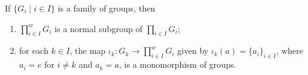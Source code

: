 \begin{theorem}
If $\{G_i \mid i \in I\}$ is a family of groups, then
\begin{enumerate}
    \item[(i)] $\prod_{i \in I}^w G_i$ is a normal subgroup of $\prod_{i \in I} G_i$;
    \item[(ii)] for each $k \in I$, the map $\iota_k : G_k \rightarrow \prod_{i \in I}^w G_i$ given by $\iota_k(a) = \{a_i\}_{i \in I}$, where $a_i = e$ for $i \neq k$ and $a_k = a$, is a monomorphism of groups.
\end{enumerate}
\end{theorem}
